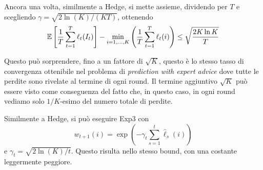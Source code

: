 Ancora una volta, similmente a Hedge, si mette assieme, dividendo per $T$ e scegliendo $\gamma = \sqrt{2 \ln (K) / (KT)}$, ottenendo
$$ \mathbb{E} \left[\frac{1}{T} \sum_{t = 1}^T \ell_t (I_t) \right] - \min_{i = 1, \dots, K} \left(\frac{1}{T} \sum_{t = 1}^T \ell_t (i) \right) \leq \sqrt{\frac{2K \ln K}{T}} $$

Questo può sorprendere, fino a un fattore di $\sqrt{K}$, questo è lo stesso tasso di convergenza ottenibile nel problema di \textit{prediction with expert advice} dove tutte le perdite sono rivelate al termine di ogni round. Il termine aggiuntivo $\sqrt{K}$ può essere visto come conseguenza del fatto che, in questo caso, in ogni round vediamo solo $1/K$-esimo del numero totale di perdite.

Similmente a Hedge, si può eseguire Exp3 con
$$ w_{t+1} (i) = \exp \left(- \gamma_t \sum_{s = 1}^t \hat \ell_s (i)\right) $$
e $\gamma_t = \sqrt{2 \ln (K) /t}$. Questo risulta nello stesso bound, con una costante leggermente peggiore.

